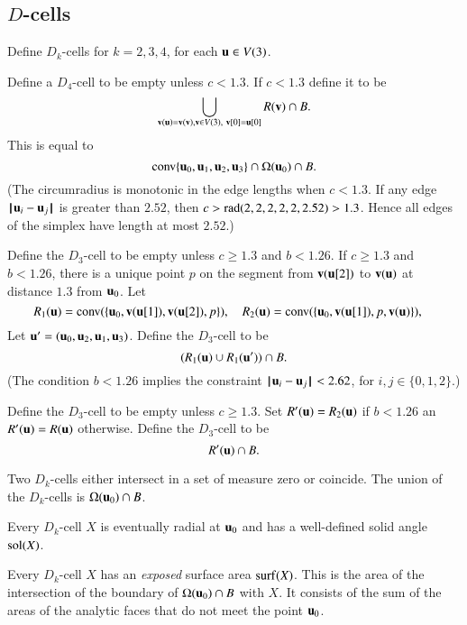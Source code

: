\subsection{$D$-cells}

Define $D_k$-cells for $k=2,3,4$, for each $ {\mathbf u}\in V(3)$.
%
%

  Define a $D_4$-cell to be empty unless $c<1.3$.  If $c<1.3$ define it to be
  $$
  \bigcup_{{\mathbf v}( {\mathbf u})={\mathbf v}({\mathbf v}),  {\mathbf v}\in  V(3),\ {\mathbf v}[0]= {\mathbf u}[0]}  R({\mathbf v})\cap B.
$$
This is equal to
$$
{\operatorname{conv}}\{ {\mathbf u}_0, {\mathbf u}_1, {\mathbf u}_2, {\mathbf u}_3\} \cap \Omega( {\mathbf u}_0)\cap B.
$$
(The circumradius is monotonic in the edge lengths when $c<1.3$.
If any edge ${\hskip0.1em|\hskip-0.15em|\hskip0.1em} {\mathbf u}_i -  {\mathbf u}_j{\hskip0.1em|\hskip-0.15em|\hskip0.1em}$ is greater than $2.52$, then
$c > {\operatorname{rad}}(2,2,2,2,2,2.52) > 1.3$.  Hence all edges of the simplex have length at most $2.52$.)
%

 Define the $D_3$-cell to be empty unless $c\ge 1.3$ and $b< 1.26$.  If $c \ge 1.3$ and $b< 1.26$, there is a unique point $p$
on the segment from ${\mathbf v}( {\mathbf u}[2])$ to ${\mathbf v}( {\mathbf u})$ at distance $1.3$ from $ {\mathbf u}_0$.  Let 
$$
R_1( {\mathbf u}) = {\operatorname{conv}}(\{ {\mathbf u}_0,{\mathbf v}( {\mathbf u}[1]),{\mathbf v}( {\mathbf u}[2]),p\} ),\quad
R_2( {\mathbf u}) = {\operatorname{conv}}(\{ {\mathbf u}_0,{\mathbf v}( {\mathbf u}[1]),p,{\mathbf v}( {\mathbf u})\} ),\quad
$$
Let $ {\mathbf u}' = ( {\mathbf u}_0, {\mathbf u}_2, {\mathbf u}_1, {\mathbf u}_3)$.
Define the $D_3$-cell to be
$$
(R_1( {\mathbf u}) \cup R_1( {\mathbf u}'))\cap B.
$$
(The condition $b< 1.26$ implies the constraint ${\hskip0.1em|\hskip-0.15em|\hskip0.1em} {\mathbf u}_i -  {\mathbf u}_j{\hskip0.1em|\hskip-0.15em|\hskip0.1em}< 2.62$, for $i,j\in\{0,1,2\}$.)

 Define the $D_3$-cell to be empty unless $c\ge 1.3$.
Set $R'( {\mathbf u}) = R_2( {\mathbf u})$ if $b< 1.26$ an $R'( {\mathbf u}) = R( {\mathbf u})$
otherwise.  Define the $D_3$-cell to be
$$
R'( {\mathbf u}) \cap B.
$$

\begin{lemma}  Two $D_k$-cells either intersect in a set of measure zero or coincide.  The union of the $D_k$-cells is $\Omega( {\mathbf u}_0)\cap B$.
\end{lemma}
%

Every $D_k$-cell $X$ is eventually radial at $ {\mathbf u}_0$ and has
a well-defined solid angle $\operatorname{sol}(X)$.
%

Every $D_k$-cell $X$ has an {\it exposed} surface area ${\operatorname{surf}}(X)$.
This is the area of the intersection of the boundary of 
$\Omega( {\mathbf u}_0)\cap B$ with $X$.  It consists of the sum of the
areas of the analytic faces that do not meet the point $ {\mathbf u}_0$.
%
%
%

